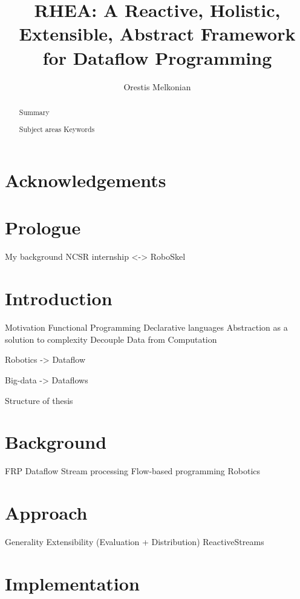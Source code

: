 \documentclass[a4]{report}
\begin{document}
\title{RHEA: A Reactive, Holistic, Extensible, Abstract Framework for Dataflow Programming}
\author{Orestis Melkonian}

\maketitle

\begin{abstract}
Summary

Subject areas
Keywords
\end{abstract}

\chapter{Acknowledgements}

\tableofcontents

\chapter{Prologue}
My background
NCSR internship <-> RoboSkel

\chapter{Introduction}

Motivation
	Functional Programming	
	Declarative languages
	Abstraction as a solution to complexity 
	Decouple Data from Computation	

Robotics -> Dataflow

Big-data -> Dataflows

Structure of thesis


\chapter{Background}

FRP
Dataflow
Stream processing
Flow-based programming
Robotics


\chapter{Approach}

Generality
Extensibility (Evaluation + Distribution)
ReactiveStreams


\chapter{Implementation}
\end{document}
